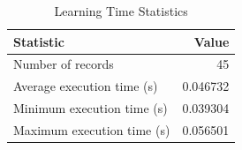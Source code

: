 
\begin{table}[h!]
\centering
\begin{tabular}{l r}
\hline
Statistic & Value \\
\hline
Number of records & 45 \\
Average execution time (s) & 0.046732 \\
Minimum execution time (s) & 0.039304 \\
Maximum execution time (s) & 0.056501 \\
\hline
\end{tabular}
\caption{Learning Time Statistics}
\end{table}
